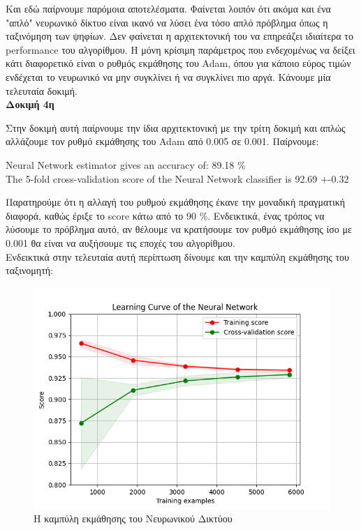 \documentclass[11pt]{article} %
\begin{document}
Και εδώ παίρνουμε παρόμοια αποτελέσματα. Φαίνεται λοιπόν ότι ακόμα και ένα "απλό" νευρωνικό δίκτυο είναι ικανό να λύσει ένα τόσο απλό πρόβλημα όπως η ταξινόμηση των ψηφίων. Δεν φαίνεται η αρχιτεκτονική του να επηρεάζει ιδιαίτερα το performance του αλγορίθμου. Η μόνη κρίσιμη παράμετρος που ενδεχομένως να δείξει κάτι διαφορετικό είναι ο ρυθμός εκμάθησης του Adam, όπου για κάποιο εύρος τιμών ενδέχεται το νευρωνικό να μην συγκλίνει ή να συγκλίνει πιο αργά. Κάνουμε μία τελευταία δοκιμή. \\

\textbf{Δοκιμή 4η}

Στην δοκιμή αυτή παίρνουμε την ίδια αρχιτεκτονική με την τρίτη δοκιμή και απλώς αλλάζουμε τον ρυθμό εκμάθησης του Adam από 0.005 σε 0.001. Παίρνουμε:\\
\begin{center}
Neural Network estimator gives an accuracy of: 89.18 \% \\
The 5-fold cross-validation score of the Neural Network classifier is 92.69 +-0.32
\end{center}

Παρατηρούμε ότι η αλλαγή του ρυθμού εκμάθησης έκανε την μοναδική πραγματική διαφορά, καθώς έριξε το score κάτω από το 90 \%. Ενδεικτικά, ένας τρόπος να λύσουμε το πρόβλημα αυτό, αν θέλουμε να κρατήσουμε τον ρυθμό εκμάθησης ίσο με 0.001 θα είναι να αυξήσουμε τις εποχές του αλγορίθμου. \\

Ενδεικτικά στην τελευταία αυτή περίπτωση δίνουμε και την καμπύλη εκμάθησης του ταξινομητή:
\begin{figure}[H]
    \centering
    \includegraphics[width=1\textwidth]{plots/lc_nn.png}
    \caption{Η καμπύλη εκμάθησης του Νευρωνικού Δικτύου}
    \label{fig:nn_lc}
\end{figure}
\end{document}
